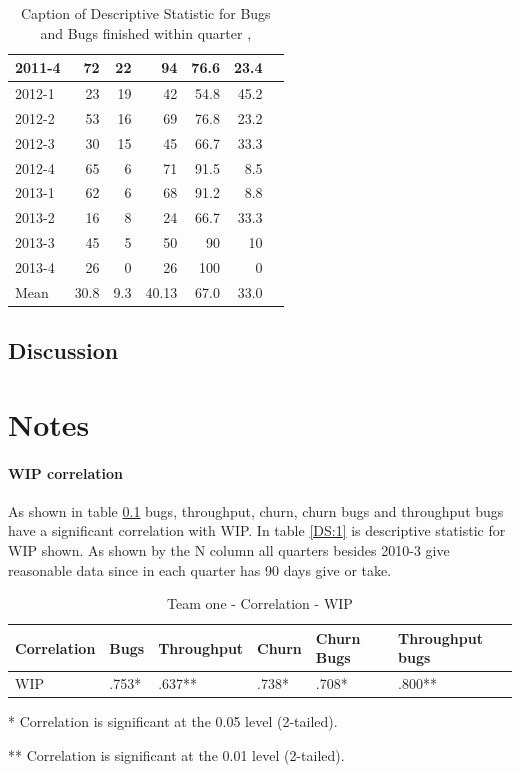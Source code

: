 \documentclass[UKenglish]{ifimaster}  %
\begin{document}
\begin{table}[!htbp]
\begin{adjustwidth}{-2.5cm}{}
{{\begin{tabular}{ | l | r | r | r | r | r | r | }
2011-4 & 72 & 22 & 94 & 76.6& 23.4 \\ \hline
2012-1 & 23 & 19 & 42 & 54.8 & 45.2 \\ \hline
2012-2 & 53 & 16 & 69 & 76.8 & 23.2 \\ \hline
2012-3 & 30 & 15 & 45 & 66.7 & 33.3\\ \hline
2012-4 & 65 & 6 & 71 & 91.5 & 8.5 \\ \hline
2013-1 & 62 & 6 & 68 & 91.2 & 8.8 \\ \hline
2013-2 & 16 & 8 & 24 & 66.7 & 33.3 \\ \hline
2013-3 & 45 & 5 & 50 & 90 & 10 \\ \hline
2013-4 & 26 & 0 & 26 & 100 & 0 \\ \hline
Mean & 30.8&9.3&40.13&67.0&33.0 \\ \hline

\end{tabular}
}
}
\end{adjustwidth}
\caption[Optional caption for list of figures]{Caption of Descriptive Statistic for Bugs and Bugs finished within quarter  , }
\label{DS:10:5} %
\end{table}
 
 
 \chapter{Discussion}
 \label{ch:discussion}

\newpage
\part{Notes}



\subsection{WIP correlation}
\label{sec:WIPC}
As shown in table \ref{corr:1} bugs, throughput, churn, churn bugs and throughput bugs have a significant correlation with WIP. In table \ref{DS:1} is descriptive statistic for WIP shown.  As shown by the N column all quarters besides 2010-3 give reasonable data since in each quarter has 90 days give or take. 

\begin{table}[!htbp] 
 \centering 
 \begin{tabular}{|l|l|l|l|l|l|} 
\hline 
Correlation  & Bugs & Throughput & Churn & Churn Bugs & Throughput bugs \\ \hline 
	WIP & .753* & .637** & .738* & .708* & .800** \\ \hline 
\end{tabular} 
 \caption{Team one - Correlation - 	WIP} 
 \label{corr:1}
    \centerline {* Correlation is significant at the 0.05 level (2-tailed).}
      \centerline{  ** Correlation is significant at the 0.01 level (2-tailed).}
 \end{table}  
 
\end{document}
